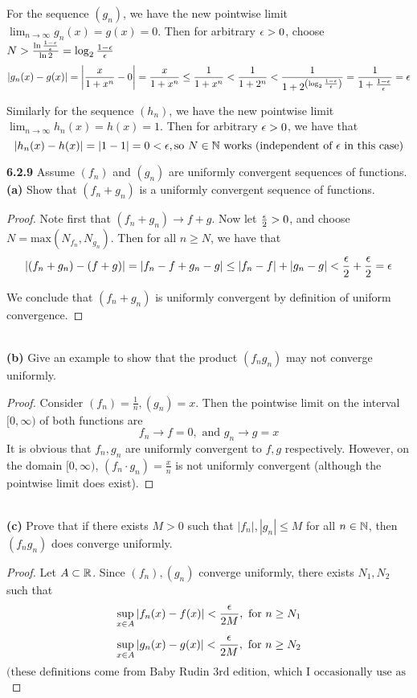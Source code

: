 \documentclass{exam}
\begin{document}
\begin{questions}
\newline\newline

For the sequence $(g_n)$, we have the new pointwise limit $\lim_{n \rightarrow \infty} g_n(x) = g(x) = 0$. Then for arbitrary $\epsilon > 0$, choose $N > \frac{\ln \frac{1 - \epsilon}{\epsilon}}{\ln 2} = \log_2 \frac{1 - \epsilon}{\epsilon}$
$$\left| g_n(x) - g(x) \right| = \left| \frac{x}{1 + x^n} - 0 \right| = \frac{x}{1 + x^n} \leq \frac{1}{1 + x^n} < \frac{1}{1 + 2^n} < \frac{1}{1 + 2^{\left( \log_2 \frac{1 - \epsilon}{\epsilon} \right)}} = \frac{1}{1 + \frac{1 - \epsilon}{\epsilon}} = \epsilon$$

\newline\newline

Similarly for the sequence $(h_n)$, we have the new pointwise limit $\lim_{n \rightarrow \infty} h_n(x) = h(x) = 1$. Then for arbitrary $\epsilon > 0$, we have that
$$\left| h_n(x) - h(x) \right| = \left| 1 - 1 \right| = 0 < \epsilon, \text{so $N\in\mathbb {N}$ works (independent of $\epsilon$ in this case)}$$




\newpage
\textbf{6.2.9 }
Assume $(f_n)$ and $(g_n)$ are uniformly convergent sequences of functions.
\\
\textbf{(a) }
Show that $(f_n + g_n)$ is a uniformly convergent sequence of functions.
\begin{proof}
    Note first that $(f_n + g_n) \rightarrow f + g$. Now let $\frac{\epsilon}{2} > 0$, and choose $N = \text{max}(N_{f_n}, N_{g_n})$. Then for all $n \geq N$, we have that
    $$\left| (f_n + g_n) - (f + g) \right| = \left| f_n - f + g_n - g \right| \leq \left| f_n - f \right| + \left| g_n - g \right| < \frac{\epsilon}{2} + \frac{\epsilon}{2} = \epsilon$$

    We conclude that $(f_n + g_n)$ is uniformly convergent by definition of uniform convergence.
\end{proof}
\\
\textbf{(b) }
Give an example to show that the product $(f_ng_n)$ may not converge uniformly.
\begin{proof}
    Consider $(f_n) = \frac{1}{n}, (g_n) = x$. Then the pointwise limit on the interval $[0, \infty)$ of both functions are
    $$f_n \rightarrow f = 0, \text{ and } g_n \rightarrow g = x$$
    It is obvious that $f_n, g_n$ are uniformly convergent to $f, g$ respectively. However, on the domain $[0, \infty)$, $(f_n \cdot g_n) = \frac{x}{n}$ is not uniformly convergent (although the pointwise limit does exist).
    
\end{proof}
\\
\textbf{(c) }
Prove that if there exists $M > 0$ such that $|f_n|, |g_n| \leq M$ for all $n \in \mathbb {N}$, then $(f_ng_n)$ does converge uniformly.
\begin{proof}
    Let $A \subset \mathbb {R}$. Since $(f_n), (g_n)$ converge uniformly, there exists $N_1, N_2$ such that
    $$\sup_{x\in A} \left| f_n(x) - f(x) \right| < \frac{\epsilon}{2M}, \text{ for } n \geq N_1$$
    $$\sup_{x\in A} \left| g_n(x) - g(x) \right| < \frac{\epsilon}{2M}, \text{ for } n \geq N_2$$
    $$\text{(these definitions come from Baby Rudin 3rd edition, which I occasionally use as a secondary text)}$$


\end{proof}
\end{questions}
\end{document}
